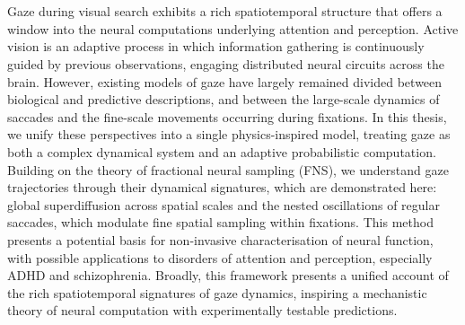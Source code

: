 \chapter*{}

Gaze during visual search exhibits a rich spatiotemporal structure that offers a window into the neural computations underlying attention and perception. Active vision is an adaptive process in which information gathering is continuously guided by previous observations, engaging distributed neural circuits across the brain. However, existing models of gaze have largely remained divided between biological and predictive descriptions, and between the large-scale dynamics of saccades and the fine-scale movements occurring during fixations. In this thesis, we unify these perspectives into a single physics-inspired model, treating gaze as both a complex dynamical system and an adaptive probabilistic computation. Building on the theory of fractional neural sampling (FNS), we understand gaze trajectories through their dynamical signatures, which are demonstrated here: global superdiffusion across spatial scales and the nested oscillations of regular saccades, which modulate fine spatial sampling within fixations. This method presents a potential basis for non-invasive characterisation of neural function, with possible applications to disorders of attention and perception, especially ADHD and schizophrenia. Broadly, this framework presents a unified account of the rich spatiotemporal signatures of gaze dynamics, inspiring a mechanistic theory of neural computation with experimentally testable predictions.